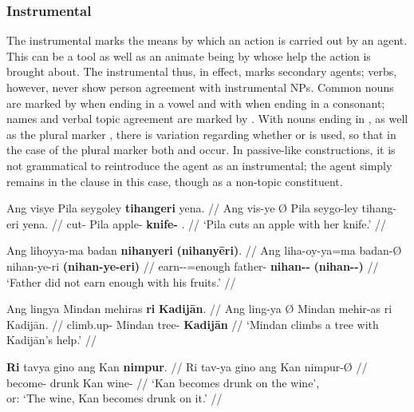 
\subsubsection{Instrumental}
\label{subsubsec:instrumental}

The instrumental marks the means by which an action is carried out by an agent. 
This can be a tool as well as an animate being by whose help the action is 
brought about. The instrumental thus, in effect, marks secondary agents; verbs, 
however, never show person agreement with instrumental NPs. Common nouns are 
marked by  when ending in a vowel and with  
when ending in a consonant; names and verbal topic agreement are marked by 
. With nouns ending in , as well as the plural marker 
, there is variation regarding whether  or 
 is used, so that in the case of the plural marker both 
 and  occur. In passive-like 
constructions, it is not grammatical to reintroduce the agent as an 
instrumental; the agent simply remains in the clause in this case, though as a 
non-topic constituent.

\pex
\a\begingl
	\gla Ang visye {} Pila seygoley \textbf{tihangeri} yena. //
	\glb Ang vis-ye Ø Pila seygo-ley tihang-eri yena. //
	\glc \AgtT{} cut-\TsgF{} \Top{} Pila apple-\PargI{} 
		\textbf{knife-\Ins{}} \TsgF{}.\Gen{} //
	\glft `Pila cuts an apple with her knife.' //
\endgl

\a\begingl
	\gla Ang lihoyya-ma badan \textbf{nihanyeri} \textbf{(nihanyēri)}. //
	\glb Ang liha-oy-ya=ma badan-Ø nihan-ye-ri 
		\textbf{(nihan-ye-eri)} //
	\glc \AgtT{} earn-\Neg{}-\TsgM{}=enough father-\Top{} 
		\textbf{nihan-\Pl{}-\Ins} \textbf{(nihan-\Pl{}-\Ins)} //
	\glft `Father did not earn enough with his fruits.' //
\endgl

\a\begingl
	\gla Ang lingya {} Mindan mehiras \textbf{ri} \textbf{Kadijān}. //
	\glb Ang ling-ya Ø Mindan mehir-as ri Kadijān. //
	\glc \AgtT{} climb.up-\TsgM{} \Top{} Mindan tree-\Parg{} 
		\textbf{\Ins{}} \textbf{Kadijān} //
	\glft `Mindan climbs a tree with Kadijān's help.' //
\endgl

\a\begingl
	\gla \textbf{Ri} tavya gino ang Kan \textbf{nimpur}. //
	\glb Ri tav-ya gino ang Kan nimpur-Ø //
	\glc \InsT{} become-\TsgM{} drunk \Aarg{} Kan wine-\Top{} //
	\glft `Kan becomes drunk on the wine', \\
		or: `The wine, Kan becomes drunk on it.' //
\endgl

